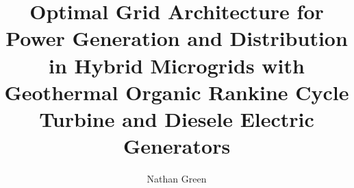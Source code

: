 \documentclass[12pt]{uafthesis}
\author{Nathan Green}
\title{Optimal Grid Architecture for Power Generation and Distribution in Hybrid Microgrids with Geothermal Organic Rankine Cycle Turbine and Diesele Electric Generators}
\begin{document}
\makesig
\maketitle



\tableofcontents
\listoffigures
\listoftables







\end{document}
